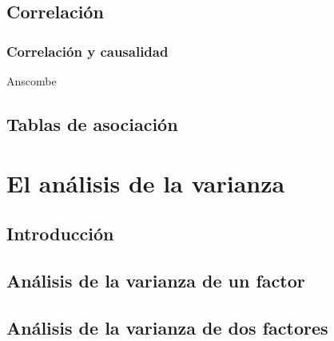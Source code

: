 \documentclass[
  letterpaper,
  DIV=11,
  numbers=noendperiod,
  oneside]{scrreprt}
\begin{document}
\hypertarget{correlaciuxf3n}{%
\section{Correlación}\label{correlaciuxf3n}}

\hypertarget{correlaciuxf3n-y-causalidad}{%
\subsection{Correlación y
causalidad}\label{correlaciuxf3n-y-causalidad}}

Anscombe

\hypertarget{tablas-de-asociaciuxf3n}{%
\section{Tablas de asociación}\label{tablas-de-asociaciuxf3n}}


\hypertarget{el-anuxe1lisis-de-la-varianza}{%
\chapter{El análisis de la
varianza}\label{el-anuxe1lisis-de-la-varianza}}

\hypertarget{introducciuxf3n-1}{%
\section{Introducción}\label{introducciuxf3n-1}}

\hypertarget{anuxe1lisis-de-la-varianza-de-un-factor}{%
\section{Análisis de la varianza de un
factor}\label{anuxe1lisis-de-la-varianza-de-un-factor}}

\hypertarget{anuxe1lisis-de-la-varianza-de-dos-factores}{%
\section{Análisis de la varianza de dos
factores}\label{anuxe1lisis-de-la-varianza-de-dos-factores}}

\hypertarget{section}{%
\section{}\label{section}}

\end{document}
